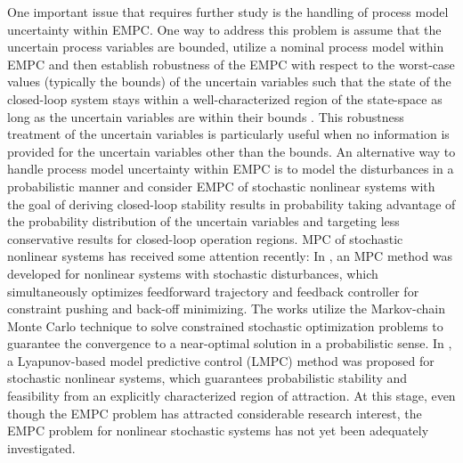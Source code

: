 \documentclass[letterpaper, 10pt, conference]{ieeeconf}
\begin{document}
	
	One important issue that requires further study is the handling of
	process model uncertainty within EMPC. One way to address this
	problem is assume that the uncertain process variables are bounded,
	utilize a nominal process model within EMPC and then establish robustness
	of the EMPC with respect to the worst-case values (typically the bounds)
	of the uncertain variables such that the state of the closed-loop
	system stays within a well-characterized region of the state-space as
	long as the uncertain variables are within their bounds
	\cite{Heidarinejad2012855}. This robustness treatment of the uncertain
	variables is particularly useful when no information is provided
	for the uncertain variables other than the bounds. An alternative way to
	handle process model uncertainty within EMPC is to model the
	disturbances in a probabilistic manner and consider EMPC of stochastic
	nonlinear systems with the goal of deriving closed-loop stability results
	in
	probability taking advantage of the probability distribution of the
	uncertain variables and targeting less conservative results for
	closed-loop
	operation regions. MPC of stochastic nonlinear systems has received some
	attention recently:
	In \cite{van2006stochastic}, an MPC method was developed for nonlinear
	systems with stochastic disturbances, which simultaneously optimizes
	feedforward trajectory and feedback controller for constraint pushing and
	back-off minimizing. The works
	\cite{visintini2006monte,maciejowski2007nmpc} utilize the Markov-chain
	Monte Carlo technique to solve constrained stochastic optimization
	problems to guarantee the convergence to a near-optimal solution in a
	probabilistic sense. In \cite{mahmood2012lyapunov}, a Lyapunov-based model
	predictive control (LMPC) method was proposed for stochastic nonlinear
	systems, which guarantees probabilistic stability and feasibility from an
	explicitly characterized region of attraction. At this stage, even though
	the EMPC problem has attracted considerable research interest, the EMPC
	problem for nonlinear stochastic systems   has not yet been adequately
	investigated.
	
\end{document}

